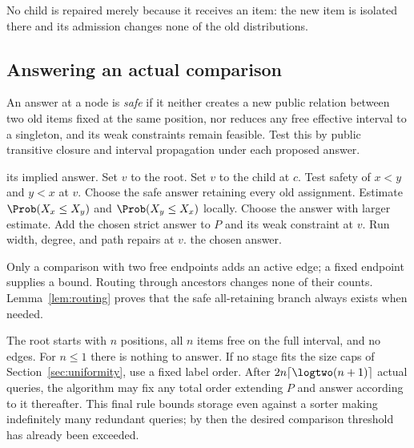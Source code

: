 No child is repaired merely because it receives an item: the new item is
isolated there and its admission changes none of the old distributions.

\subsection{Answering an actual comparison}
\label{sec:answer}

An answer at a node is \emph{safe} if it neither creates a new public
relation between two old items fixed at the same position, nor reduces any
free effective interval to a singleton, and its weak constraints remain
feasible. Test this by public transitive closure and interval propagation
under each proposed answer.

\begin{algorithm}[ht]
\caption{\textsc{Answer}$(x,y)$}
\label{alg:answer}
\begin{algorithmic}[1]
  \State \Return its implied answer.
\EndIf
\State Set $v$ to the root.
  \State Set $v$ to the child at $c$.
\EndWhile
\State Test safety of $x<y$ and $y<x$ at $v$.
  \State Choose the safe answer retaining every old assignment.
\Else
  \State Estimate $\Prob(X_x\leq X_y)$ and $\Prob(X_y\leq X_x)$ locally.
  \State Choose the answer with larger estimate.
\EndIf
\State Add the chosen strict answer to $P$ and its weak constraint at $v$.
\State Run width, degree, and path repairs at $v$.
\State \Return the chosen answer.
\end{algorithmic}
\end{algorithm}

Only a comparison with two free endpoints adds an active edge; a fixed
endpoint supplies a bound. Routing through ancestors changes none of their
counts. Lemma~\ref{lem:routing} proves that the safe all-retaining branch
always exists when needed.

The root starts with $n$ positions, all $n$ items free on the full interval,
and no edges. For $n\leq1$ there is nothing to answer. If no stage fits the
size caps of Section~\ref{sec:uniformity}, use a fixed label order.
After $2n\lceil\logtwo(n+1)\rceil$ actual queries, the algorithm may fix any
total order extending $P$ and answer according to it thereafter. This final
rule bounds storage even against a sorter making indefinitely many redundant
queries; by then the desired comparison threshold has already been exceeded.

